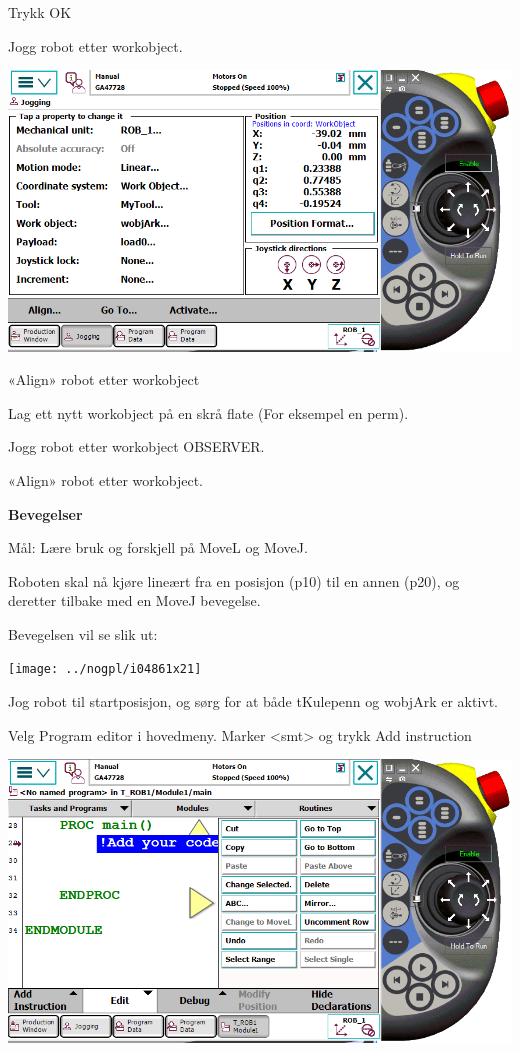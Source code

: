Trykk OK 

Jogg robot etter workobject.

\includegraphics[width=1\textwidth]{i04861x20}

«Align» robot etter workobject

Lag ett nytt workobject på en skrå flate (For eksempel en perm). 

Jogg robot etter workobject OBSERVER. 

«Align» robot etter workobject.

\textbf{Bevegelser}

Mål: Lære bruk og forskjell på MoveL og MoveJ.

Roboten skal nå kjøre lineært fra en posisjon (p10) til en annen (p20),
og deretter tilbake med en MoveJ bevegelse.

Bevegelsen vil se slik ut:

\texttt{[image: ../nogpl/i04861x21]}

Jog robot til startposisjon, og sørg for at både tKulepenn og wobjArk
er aktivt. 

Velg Program editor i hovedmeny. Marker <smt> og trykk Add instruction

\includegraphics[width=1\textwidth]{i04861x22}

